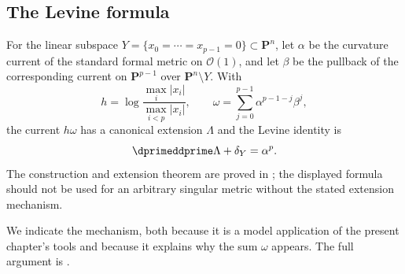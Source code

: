 \subsection{The Levine formula}
\label{sec:ch17-levine}

For the linear subspace
$Y=\{x_0=\cdots=x_{p-1}=0\}\subset\mathbf P^n$, let $\alpha$ be the
curvature current of the standard formal metric on $\mathcal O(1)$, and
let $\beta$ be the pullback of the corresponding current on
$\mathbf P^{p-1}$ over $\mathbf P^n\setminus Y$.  With
\[
 h=\log\frac{\max_i|x_i|}{\max_{i<p}|x_i|},\qquad
 \omega=\sum_{j=0}^{p-1}\alpha^{p-1-j}\beta^j,
\]
the current $h\omega$ has a canonical extension $\Lambda$ and the Levine
identity is
\[
                         \dprimeddprime\Lambda+\delta_Y=\alpha^p.
\]
The construction and extension theorem are proved in
\cite[\S18.7]{CLD25}; the displayed formula should not be used for an
arbitrary singular metric without the stated extension mechanism.

We indicate the mechanism, both because it is a model application of the
present chapter's tools and because it explains why the sum $\omega$
appears.  The full argument is .

